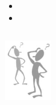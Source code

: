 \documentclass{beamer}
\begin{document}
\begin{frame}
  
  \begin{itemize}
  \item
  \item 
  \end{itemize}

  
  \begin{columns}
    \column{6cm}
    \begin{block}{}
      \centerline{ 
        \includegraphics[width=0.5\textwidth]{figures/questions.png} 
      }
    \end{block}
  \end{columns}
  
\end{frame}
\end{document}
